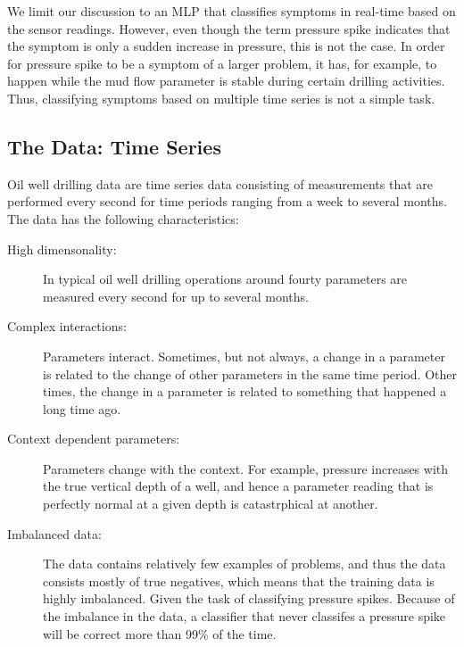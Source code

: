 \documentclass{article}
\theoremstyle{theorem}
\theoremstyle{definition}
\begin{document}
We limit our discussion to an MLP that classifies symptoms in real-time based on the sensor readings.
However, even though the term pressure spike indicates that the symptom is only a sudden increase in pressure, this is not the case.
In order for pressure spike to be a symptom of a larger problem, it has, for example, to happen while the mud flow parameter is stable during certain drilling activities.
Thus, classifying symptoms based on multiple time series is not a simple task.



\subsection{The Data: Time Series}
Oil well drilling data are time series data consisting of measurements that are performed  every second for time periods ranging from a week to several months.
The data has the following characteristics:

\begin{description}

\item [High dimensonality:] 
In typical oil well drilling operations around fourty parameters are measured every second for up to several months.

\item [Complex interactions:] 
Parameters interact. 
Sometimes, but not always, a change in a parameter is related to the change of other parameters in the same time period.
Other times, the change in a parameter is related to something that happened a long time ago.

\item [Context dependent parameters:]
Parameters change with the context.
For example, pressure increases with the true vertical depth of a well, and hence a parameter reading that is perfectly normal at a given depth is catastrphical at another.

\item [Imbalanced data:] 
The data contains relatively few examples of problems, and thus the data consists mostly of true negatives, which means that the training data is highly imbalanced. 
Given the task of classifying pressure spikes.
Because of the imbalance in the data, a classifier that never classifes a pressure spike will be correct more than 99\% of the time.
\end{description}
\end{document}

